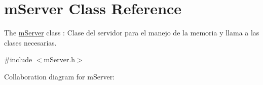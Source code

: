 \hypertarget{classm_server}{}\section{m\+Server Class Reference}
\label{classm_server}


The \hyperlink{classm_server}{m\+Server} class \+: Clase del servidor para el manejo de la memoria y llama a las clases necesarias.  




{\ttfamily \#include $<$m\+Server.\+h$>$}



Collaboration diagram for m\+Server\+:
